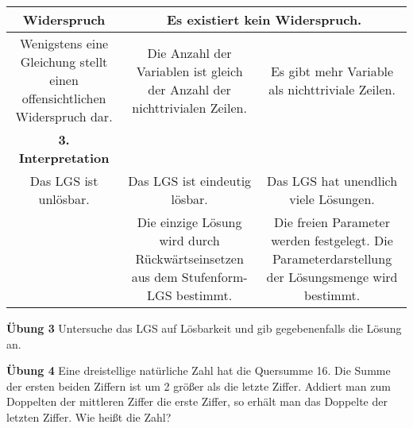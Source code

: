 \documentclass{article}
\begin{document}
\begin{center}
\begin{tabular}{|c|c|c|}
\hline
\textbf{Widerspruch} & \multicolumn{2}{c|}{\textbf{Es existiert kein Widerspruch.}} \\
\hline
Wenigstens eine Gleichung stellt einen offensichtlichen Widerspruch dar. & Die Anzahl der Variablen ist gleich der Anzahl der nichttrivialen Zeilen. & Es gibt mehr Variable als nichttriviale Zeilen. \\
\hline
\textbf{3. Interpretation} & & \\
\hline
Das LGS ist unlösbar. & Das LGS ist eindeutig lösbar. & Das LGS hat unendlich viele Lösungen. \\
\hline
& Die einzige Lösung wird durch Rückwärtseinsetzen aus dem Stufenform-LGS bestimmt. & Die freien Parameter werden festgelegt. Die Parameterdarstellung der Lösungsmenge wird bestimmt. \\
\hline
\end{tabular}
\end{center}

\begin{framed}
\textbf{Übung 3} Untersuche das LGS auf Lösbarkeit und gib gegebenenfalls die Lösung an.
\end{framed}

\begin{framed}
\textbf{Übung 4} Eine dreistellige natürliche Zahl hat die Quersumme 16. Die Summe der ersten beiden Ziffern ist um 2 größer als die letzte Ziffer. Addiert man zum Doppelten der mittleren Ziffer die erste Ziffer, so erhält man das Doppelte der letzten Ziffer. Wie heißt die Zahl?
\end{framed}
\end{document}
